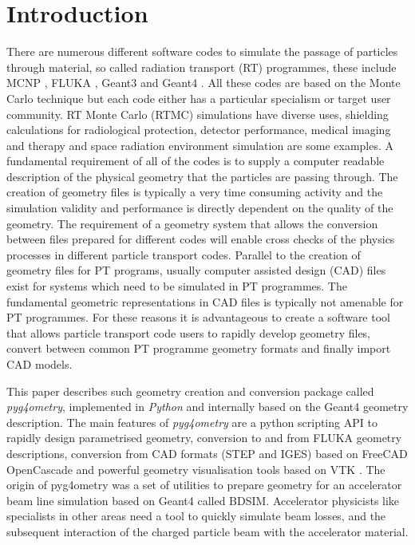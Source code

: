 \documentclass[final,5p,times,twocolumn]{elsarticle}
\begin{document}
\section{Introduction} \label{sec:introduction}
There are numerous different software codes to simulate the passage of particles through material, so called radiation transport (RT) programmes, these 
include MCNP \cite{Mcnp_Werner}, FLUKA \cite{Fluka_Ferrari,Fluka_Bohlen}, Geant3 \cite{Geant3_Brun} and Geant4 \cite{Geant4_Agostinelli}. 
All these codes are based on the Monte Carlo technique but each code either has a particular specialism or target user community.  RT Monte Carlo (RTMC) simulations 
have diverse uses, shielding calculations for radiological protection, detector performance, medical imaging and therapy and space radiation environment 
simulation are some examples. A fundamental requirement of all of the codes is to supply a computer readable description of the physical geometry that 
the particles are passing through.  The creation of geometry files is typically a very time consuming activity and the simulation validity and performance is directly 
dependent on the quality of the geometry. The requirement of a geometry system that allows the conversion between files prepared for different codes will 
enable cross checks of the physics processes in different particle transport codes. Parallel to the creation of geometry files for PT programs, usually computer assisted 
design (CAD) files exist for systems which need to be simulated in PT programmes. The fundamental geometric representations in CAD files is typically not 
amenable for PT programmes.  For these reasons it is advantageous to create a software tool that allows particle transport code users to rapidly develop 
geometry files, convert between common PT programme geometry formats and finally import CAD models. 

This paper describes such geometry creation and conversion package called {\em pyg4ometry}, implemented in {\em Python} and internally based on the Geant4 geometry 
description. The main features of  {\em pyg4ometry} are a python scripting API to rapidly design parametrised geometry, conversion to and from  FLUKA geometry 
descriptions, conversion from CAD formats  (STEP and IGES) based on FreeCAD \cite{FreeCAD} OpenCascade \cite{OpenCASCADE} and powerful geometry 
visualisation tools based on VTK \cite{VTK4}. The origin of pyg4ometry was a set of utilities to prepare geometry for an accelerator beam line simulation based on Geant4 
called BDSIM. Accelerator physicists like specialists in other areas need a tool to quickly simulate beam losses, and the subsequent interaction of the charged particle 
beam with the accelerator material.
\end{document}
